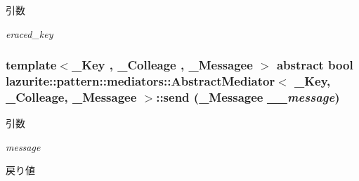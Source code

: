 \begin{DoxyParams}{引数}
\item[{\em eraced\_\-key}]\end{DoxyParams}
\hypertarget{classlazurite_1_1pattern_1_1mediators_1_1_abstract_mediator_3_01___key_00_01___colleage_00_01___messagee_01_4_a01ffda0e485054adb68cf914142c66a0}{
\subsubsection[{send}]{\setlength{\rightskip}{0pt plus 5cm}template$<$\_\-Key , \_\-Colleage , \_\-Messagee $>$ abstract bool lazurite::pattern::mediators::AbstractMediator$<$ \_\-Key, \_\-Colleage, \_\-Messagee $>$::send (\_\-Messagee {\em \_\-\_\-message})}}
\label{classlazurite_1_1pattern_1_1mediators_1_1_abstract_mediator_3_01___key_00_01___colleage_00_01___messagee_01_4_a01ffda0e485054adb68cf914142c66a0}

\begin{DoxyParams}{引数}
\item[{\em message}]\end{DoxyParams}
\begin{DoxyReturn}{戻り値}

\end{DoxyReturn}


